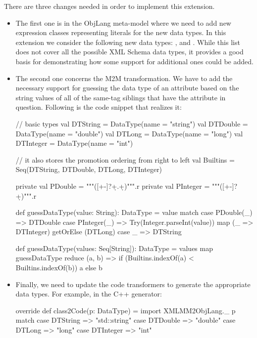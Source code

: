 There are three changes needed in order to implement this extension.
\begin{itemize}[(1)]
	\item The first one is in the ObjLang meta-model where we need to add new expression classes representing literals for the new data types.
	In this extension we consider the following new data types: ,  and .
	While this list does not cover all the possible XML Schema data types, it provides a good basis for demonstrating how some support for additional ones could be added.

	\item The second one concerns the M2M transformation.
	We have to add the necessary support for guessing the data type of an attribute based on the string values of all of the same-tag siblings that have the attribute in question.
	Following is the code snippet that realizes it:
	\begin{scalacode}
	  // basic types
	  val DTString = DataType(name = "string")
	  val DTDouble = DataType(name = "double")
	  val DTLong = DataType(name = "long")
	  val DTInteger = DataType(name = "int")

	  // it also stores the promotion ordering from right to left
	  val Builtins = Seq(DTString, DTDouble, DTLong, DTInteger)

	  private val PDouble = """([+-]?\d+.\d+)""".r
	  private val PInteger = """([+-]?\d+)""".r

	  def guessDataType(value: String): DataType = value match {
	    case PDouble(_) => DTDouble
	    case PInteger(_) => Try(Integer.parseInt(value)) map (_ => DTInteger) getOrElse (DTLong)
	    case _ => DTString
	  }

	  def guessDataType(values: Seq[String]): DataType =
	    values map guessDataType reduce { (a, b) =>
	      if (Builtins.indexOf(a) < Builtins.indexOf(b)) a else b
	    }
	\end{scalacode}

	\item Finally, we need to update the code transformers to generate the appropriate data types.
	For example, in the C++ generator:
	\begin{scalacode}
override def class2Code(p: DataType) = {
  import XMLMM2ObjLang._
  p match {
    case DTString => "std::string"
    case DTDouble => "double"
    case DTLong => "long"
    case DTInteger => "int"
  }
}		
	\end{scalacode}
\end{itemize}

